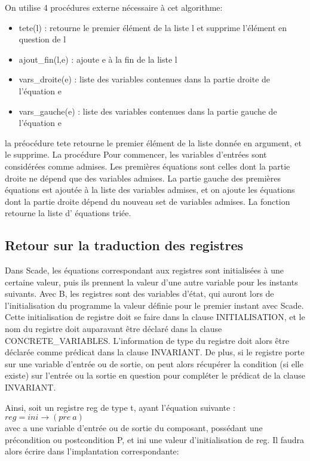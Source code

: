 On utilise 4 procédures externe nécessaire à cet algorithme:
\begin{itemize}
\item tete(l) : retourne le premier élément de la liste l et supprime l'élément
  en question de l
\item ajout\_fin(l,e) : ajoute e à la fin de la liste l
\item vars\_droite(e) : liste des variables contenues dans la partie droite de
  l'équation e
\item vars\_gauche(e) : liste des variables contenues dans la partie gauche de
  l'équation e
\end{itemize}
la préocédure tete retourne le premier élément de la liste donnée en argument,
et le supprime. La procédure 
Pour commencer, les variables d'entrées sont considérées comme admises. Les
premières équations sont celles dont la partie droite ne dépend que des
variables admises. La partie gauche des premières équations est ajoutée à la
liste des variables admises, et on ajoute les équations dont la partie droite
dépend du nouveau set de variables admises. La fonction retourne la liste d'
équations triée.

\subsection{Retour sur la traduction des registres}
Dans Scade, les équations correspondant aux registres sont initialisées à une
certaine valeur, puis ils prennent la valeur d'une autre variable pour les
instants suivants. Avec B, les registres sont des variables
d'état, qui auront lors de l'initialisation du programme la valeur définie pour
le premier instant avec Scade.
Cette initialisation de registre doit se faire dans la clause INITIALISATION, et
le nom du registre doit auparavant être déclaré dans la clause CONCRETE\_VARIABLES. L'information de
type du registre doit alors être déclarée comme prédicat dans la clause
INVARIANT. De plus, si le registre porte sur une variable d'entrée ou de sortie,
on peut alors récupérer la condition (si elle existe) sur l'entrée ou la sortie
en question pour compléter le prédicat de la clause INVARIANT. 

Ainsi, soit un registre reg de type t, ayant l'équation suivante :\\
$reg = ini \rightarrow (pre ~a)$ \\
avec a une variable d'entrée ou de sortie du composant, possédant une
précondition ou postcondition P, et ini une valeur d'initialisation de
reg. Il faudra alors écrire dans l'implantation correspondante: 


